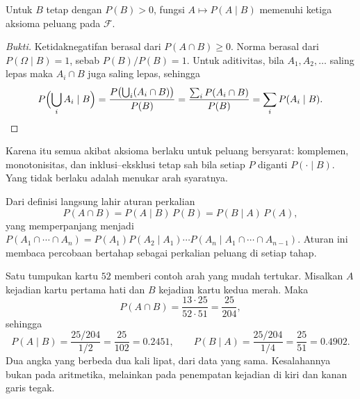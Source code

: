 \begin{proposisi}
Untuk $B$ tetap dengan $P(B)>0$, fungsi $A\mapsto P(A\mid B)$ memenuhi ketiga aksioma
peluang pada $\mathcal{F}$.
\end{proposisi}

\begin{proof}[Bukti]
Ketidaknegatifan berasal dari $P(A\cap B)\ge 0$. Norma berasal dari $P(\Omega\mid B)=1$,
sebab $P(B)/P(B)=1$. Untuk aditivitas, bila $A_{1},A_{2},\dots$ saling lepas
maka $A_{i}\cap B$ juga saling lepas, sehingga
\[
P\Bigl(\bigcup_{i}A_{i}\mid B\Bigr)
=\frac{P\bigl(\bigcup_{i}(A_{i}\cap B)\bigr)}{P(B)}
=\frac{\sum_{i}P(A_{i}\cap B)}{P(B)}
=\sum_{i}P(A_{i}\mid B).\qedhere
\]
\end{proof}

Karena itu semua akibat aksioma berlaku untuk peluang bersyarat: komplemen, monotonisitas,
dan inklusi--eksklusi tetap sah bila setiap $P$ diganti $P(\cdot\mid B)$. Yang tidak
berlaku adalah menukar arah syaratnya.

Dari definisi langsung lahir aturan perkalian
\[
P(A\cap B)=P(A\mid B)\,P(B)=P(B\mid A)\,P(A),
\]
yang memperpanjang menjadi
$P(A_{1}\cap\cdots\cap A_{n})=P(A_{1})P(A_{2}\mid A_{1})\cdots
P(A_{n}\mid A_{1}\cap\cdots\cap A_{n-1})$. Aturan ini membaca percobaan bertahap
sebagai perkalian peluang di setiap tahap.

Satu tumpukan kartu $52$ memberi contoh arah yang mudah tertukar. Misalkan $A$ kejadian
kartu pertama hati dan $B$ kejadian kartu kedua merah. Maka
\[
P(A\cap B)=\frac{13\cdot 25}{52\cdot 51}=\frac{25}{204},
\]
sehingga
\[
P(A\mid B)=\frac{25/204}{1/2}=\frac{25}{102}=0.2451,
\qquad
P(B\mid A)=\frac{25/204}{1/4}=\frac{25}{51}=0.4902 .
\]
Dua angka yang berbeda dua kali lipat, dari data yang sama. Kesalahannya bukan pada
aritmetika, melainkan pada penempatan kejadian di kiri dan kanan garis tegak.

